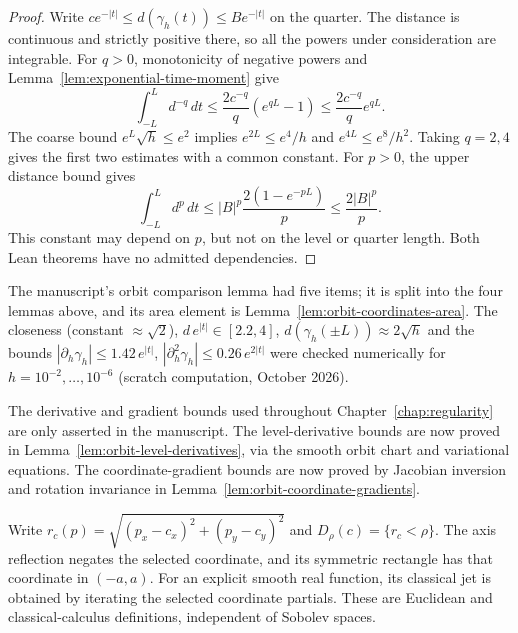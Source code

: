 \begin{proof}
\leanok
Write $c e^{-|t|}\le d(\gamma_h(t))\le B e^{-|t|}$ on the quarter.
The distance is continuous and strictly positive there, so all the powers
under consideration are integrable.
For $q>0$, monotonicity of negative powers and
Lemma~\ref{lem:exponential-time-moment} give
\[
  \int_{-L}^L d^{-q}\,dt
  \le \frac{2c^{-q}}q(e^{qL}-1)
  \le \frac{2c^{-q}}q e^{qL}.
\]
The coarse bound $e^L\sqrt h\le e^2$ implies
$e^{2L}\le e^4/h$ and $e^{4L}\le e^8/h^2$.
Taking $q=2,4$ gives the first two estimates with a common constant.
For $p>0$, the upper distance bound gives
\[
  \int_{-L}^L d^p\,dt
  \le |B|^p\frac{2(1-e^{-pL})}p
  \le \frac{2|B|^p}p.
\]
This constant may depend on $p$, but not on the level or quarter length.
Both Lean theorems have no admitted dependencies.
\end{proof}

\begin{remark}
The manuscript's orbit comparison lemma had five items; it is split into the four
lemmas above, and its area element is Lemma~\ref{lem:orbit-coordinates-area}. The
closeness (constant $\approx\sqrt2$), $d\,e^{|t|}\in[2.2,4]$, $d(\gamma_h(\pm L))\approx2\sqrt h$
and the bounds $|\partial_h\gamma_h|\le1.42\,e^{|t|}$,
$|\partial_h^2\gamma_h|\le0.26\,e^{2|t|}$ were checked numerically for
$h=10^{-2},\dots,10^{-6}$ (scratch computation, October 2026).
\end{remark}

\begin{remark}
The derivative and gradient bounds used throughout Chapter~\ref{chap:regularity}
are only asserted in the manuscript. The level-derivative bounds are now proved
in Lemma~\ref{lem:orbit-level-derivatives}, via the smooth orbit chart and
variational equations. The coordinate-gradient bounds are now proved by
Jacobian inversion and rotation invariance in
Lemma~\ref{lem:orbit-coordinate-gradients}.
\end{remark}


\begin{definition}
\label{def:local-plane-geometry}
\leanok
Write $r_c(p)=\sqrt{(p_x-c_x)^2+(p_y-c_y)^2}$ and
$D_\rho(c)=\{r_c<\rho\}$. The axis reflection negates the selected
coordinate, and its symmetric rectangle has that coordinate in $(-a,a)$.
For an explicit smooth real function, its classical jet is obtained by
iterating the selected coordinate partials. These are Euclidean and
classical-calculus definitions, independent of Sobolev spaces.
\end{definition}


